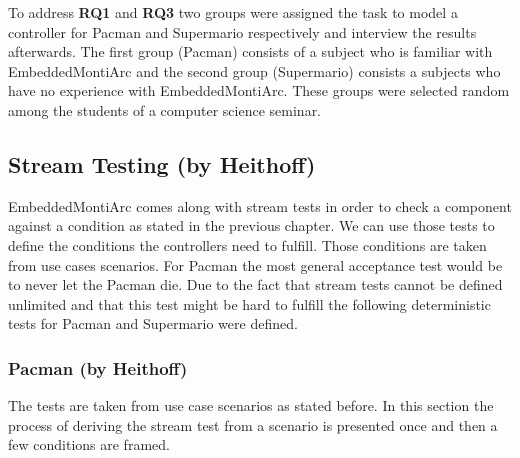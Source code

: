To address \textbf{RQ1} and \textbf{RQ3} two groups were assigned the task to model a controller for Pacman and Supermario respectively and interview the results afterwards. The first group (Pacman) consists of a subject who is familiar with EmbeddedMontiArc and the second group (Supermario) consists a subjects who have no experience with EmbeddedMontiArc. These groups were selected random among the students of a computer science seminar.
\subsection{Stream Testing (by Heithoff)}

EmbeddedMontiArc comes along with stream tests in order to check a component against a condition as stated in the previous chapter.
We can use those tests to define the conditions the controllers need to fulfill. Those conditions are taken from use cases scenarios. For Pacman the most general acceptance test would be to never let the Pacman die. Due to the fact that stream tests cannot be defined unlimited and that this test might be hard to fulfill the following deterministic tests for Pacman and Supermario were defined.

\subsubsection{Pacman (by Heithoff)}
The tests are taken from use case scenarios as stated before. In this section the process of deriving the stream test from a scenario is presented once and then a few conditions are framed. \newline

